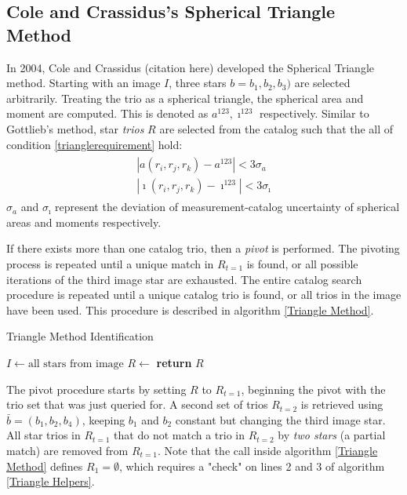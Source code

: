 \subsection{Cole and Crassidus's Spherical Triangle Method}
In 2004, Cole and Crassidus (citation here) developed the Spherical Triangle method. Starting with an image $I$, three stars $b = b_1, b_2, b_3)$ are selected arbitrarily. Treating the trio as a spherical triangle, the spherical area and moment are computed. This is denoted as $a^{123}, \imath^{123}$ respectively. Similar to Gottlieb's method, star \textit{trios} $R$ are selected from the catalog such that the all of condition \eqref{trianglerequirement} hold:
\begin{align}
\begin{split}
\label{trianglerequirement}
| a(r_i, r_j, r_k) - a^{123} | < 3 \sigma_a
\\
| \imath(r_i, r_j, r_k) - \imath^{123} | < 3\sigma_{\imath}
\end{split}
\end{align}
$\sigma_a$ and $\sigma_{\imath}$ represent the deviation of measurement-catalog uncertainty of spherical areas and moments respectively.

If there exists more than one catalog trio, then a \textit{pivot} is performed. The pivoting process is repeated until a unique match in $R_{t=1}$ is found, or all possible iterations of the third image star are exhausted. The entire catalog search procedure is repeated until a unique catalog trio is found, or all trios in the image have been used. This procedure is described in algorithm \eqref{Triangle Method}.

\begin{algorithm}
\caption{Triangle Method Identification}
\label{Triangle Method}
\begin{algorithmic}[1]
\State $I \gets \text{all stars} \text{ from image}$
\State $R \gets$ 
\State \textbf{return} $R$
\EndIf
\EndFor
\EndFor
\EndFor
\EndProcedure
\end{algorithmic}
\end{algorithm}

The pivot procedure starts by setting $R$ to $R_{t=1}$, beginning the pivot with the trio set that was just queried for. A second set of trios $R_{t=2}$ is retrieved using $\bar{b} = (b_1, b_2, b_4)$, keeping $b_1$ and $b_2$ constant but changing the third image star. All star trios in $R_{t=1}$ that do not match a trio in $R_{t=2}$ by \textit{two stars} (a partial match) are removed from $R_{t=1}$. Note that the  call inside algorithm \eqref{Triangle Method} defines $R_1 = \emptyset$, which requires a "check" on lines 2 and 3 of algorithm \eqref{Triangle Helpers}.

